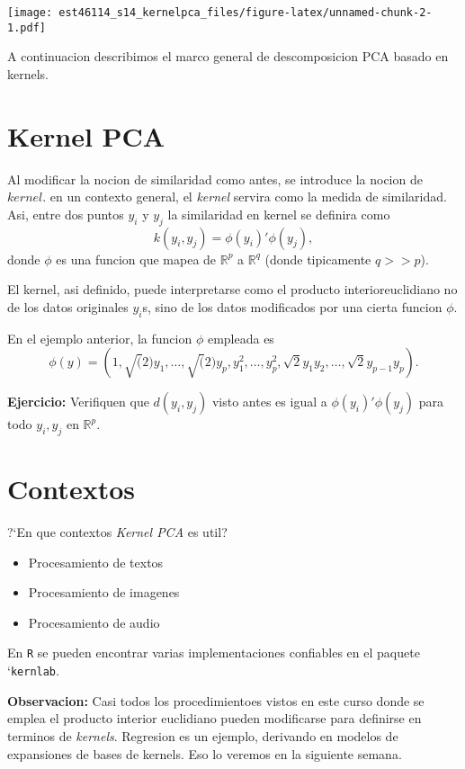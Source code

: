 \documentclass[11pt,]{article}
\begin{document}
\texttt{[image: est46114\_s14\_kernelpca\_files/figure-latex/unnamed-chunk-2-1.pdf]}

A continuacion describimos el marco general de descomposicion PCA basado
en kernels.

\section{Kernel PCA}\label{kernel-pca}

Al modificar la nocion de similaridad como antes, se introduce la nocion
de \(kernel\). en un contexto general, el \emph{kernel} servira como la
medida de similaridad. Asi, entre dos puntos \(y_i\) y \(y_j\) la
similaridad en kernel se definira como \[
k(y_i,y_j)=\phi(y_i)'\phi(y_j),
\] donde \(\phi\) es una funcion que mapea de \(\mathbb{R}^{p}\) a
\(\mathbb{R}^{q}\) (donde tipicamente \(q>>p\)).

El kernel, asi definido, puede interpretarse como el producto
interioreuclidiano no de los datos originales \(y_i\)s, sino de los
datos modificados por una cierta funcion \(\phi\).

En el ejemplo anterior, la funcion \(\phi\) empleada es \[
\phi(y)=\left(1,\sqrt(2)y_1,\ldots,\sqrt(2)y_p,y_1^{2},\ldots,y_p^{2},\sqrt{2}y_1 y_2, \ldots, \sqrt{2}y_{p-1}y_{p}\right).
\]

\textbf{Ejercicio:} Verifiquen que \(d(y_i,y_j)\) visto antes es igual a
\(\phi(y_i)'\phi(y_j)\) para todo \(y_i,y_j\) en \(\mathbb{R}^{p}\).

\section{Contextos}\label{contextos}

?`En que contextos \emph{Kernel PCA} es util?

\begin{itemize}
\item
  Procesamiento de textos
\item
  Procesamiento de imagenes
\item
  Procesamiento de audio
\end{itemize}

En \texttt{R} se pueden encontrar varias implementaciones confiables en
el paquete `\texttt{kernlab}.

\textbf{Observacion:} Casi todos los procedimientoes vistos en este
curso donde se emplea el producto interior euclidiano pueden modificarse
para definirse en terminos de \emph{kernels}. Regresion es un ejemplo,
derivando en modelos de expansiones de bases de kernels. Eso lo veremos
en la siguiente semana.
\end{document}

